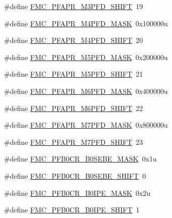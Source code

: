 \begin{DoxyCompactItemize}
\#define \hyperlink{group___f_m_c___register___masks_ga0de5ac6c72c9bc67057f028f4a946539}{F\+M\+C\+\_\+\+P\+F\+A\+P\+R\+\_\+\+M3\+P\+F\+D\+\_\+\+S\+H\+I\+FT}~19
\item 
\#define \hyperlink{group___f_m_c___register___masks_gaa1b82d16461f952ac2b92896f79059a3}{F\+M\+C\+\_\+\+P\+F\+A\+P\+R\+\_\+\+M4\+P\+F\+D\+\_\+\+M\+A\+SK}~0x100000u
\item 
\#define \hyperlink{group___f_m_c___register___masks_gaf06886cc4a8e2d455cef47f111ac8a4b}{F\+M\+C\+\_\+\+P\+F\+A\+P\+R\+\_\+\+M4\+P\+F\+D\+\_\+\+S\+H\+I\+FT}~20
\item 
\#define \hyperlink{group___f_m_c___register___masks_ga4ac647b6c05fcd080c70febe293bd169}{F\+M\+C\+\_\+\+P\+F\+A\+P\+R\+\_\+\+M5\+P\+F\+D\+\_\+\+M\+A\+SK}~0x200000u
\item 
\#define \hyperlink{group___f_m_c___register___masks_ga1efe3150392c8b3b9e4f42ec43bfef39}{F\+M\+C\+\_\+\+P\+F\+A\+P\+R\+\_\+\+M5\+P\+F\+D\+\_\+\+S\+H\+I\+FT}~21
\item 
\#define \hyperlink{group___f_m_c___register___masks_ga6d5a68ef8363082c0c7077c380e7aad6}{F\+M\+C\+\_\+\+P\+F\+A\+P\+R\+\_\+\+M6\+P\+F\+D\+\_\+\+M\+A\+SK}~0x400000u
\item 
\#define \hyperlink{group___f_m_c___register___masks_ga5ff1d949214bab253e7b426ca8fb6884}{F\+M\+C\+\_\+\+P\+F\+A\+P\+R\+\_\+\+M6\+P\+F\+D\+\_\+\+S\+H\+I\+FT}~22
\item 
\#define \hyperlink{group___f_m_c___register___masks_gac0652379651a8388e65f2e96358b72f1}{F\+M\+C\+\_\+\+P\+F\+A\+P\+R\+\_\+\+M7\+P\+F\+D\+\_\+\+M\+A\+SK}~0x800000u
\item 
\#define \hyperlink{group___f_m_c___register___masks_ga4589e8d60db033a3ab174e976a5d3dcf}{F\+M\+C\+\_\+\+P\+F\+A\+P\+R\+\_\+\+M7\+P\+F\+D\+\_\+\+S\+H\+I\+FT}~23
\item 
\#define \hyperlink{group___f_m_c___register___masks_ga9eede1bc45bf3cbaf00b4e9960f5e7eb}{F\+M\+C\+\_\+\+P\+F\+B0\+C\+R\+\_\+\+B0\+S\+E\+B\+E\+\_\+\+M\+A\+SK}~0x1u
\item 
\#define \hyperlink{group___f_m_c___register___masks_gac7bd1c5a4c5f35eb2d02351977e6a274}{F\+M\+C\+\_\+\+P\+F\+B0\+C\+R\+\_\+\+B0\+S\+E\+B\+E\+\_\+\+S\+H\+I\+FT}~0
\item 
\#define \hyperlink{group___f_m_c___register___masks_gab46173be15cdda210e83a041f8eeb809}{F\+M\+C\+\_\+\+P\+F\+B0\+C\+R\+\_\+\+B0\+I\+P\+E\+\_\+\+M\+A\+SK}~0x2u
\item 
\#define \hyperlink{group___f_m_c___register___masks_ga9fccb996200782cf4a1ec8d2418da2e5}{F\+M\+C\+\_\+\+P\+F\+B0\+C\+R\+\_\+\+B0\+I\+P\+E\+\_\+\+S\+H\+I\+FT}~1

\end{DoxyCompactItemize}
